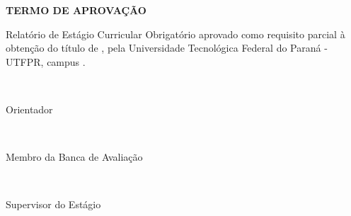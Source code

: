 \makeatletter

\begin{center}
	\Large\textbf{\MakeUppercase{Termo de Aprovação}}
\end{center}

\begin{center}
	\large{\MakeUppercase{\@author}}
\end{center}

\vspace{2\baselineskip plus 1.5\baselineskip minus 0.5\baselineskip}

\begin{center}
	Relatório de Estágio Curricular Obrigatório aprovado como requisito parcial à obtenção do título de \MakeUppercase{\@titulo}, pela Universidade Tecnológica Federal do Paraná - UTFPR, campus \@cidade.
\end{center}

\vspace{2\baselineskip plus 1.5\baselineskip minus 0.5\baselineskip}

\begin{flushright}%
	\begin{minipage}{0.5\textwidth}%
		\@orientador\\\vspace{-0.5cm}
		\begin{flushright}
			Orientador
		\end{flushright}		
	\end{minipage}
\end{flushright}

\vspace{2\baselineskip plus 1.5\baselineskip minus 0.5\baselineskip}

\begin{flushright}%
	\begin{minipage}{0.5\textwidth}%
		\@avaliador\\\vspace{-0.5cm}
		\begin{flushright}
			Membro da Banca de Avaliação
		\end{flushright}		
	\end{minipage}
\end{flushright}

\vspace{2\baselineskip plus 1.5\baselineskip minus 0.5\baselineskip}

\begin{flushright}%
	\begin{minipage}{0.5\textwidth}%
		\@supervisor\\\vspace{-0.5cm}
		\begin{flushright}
			Supervisor do Estágio
		\end{flushright}		
	\end{minipage}
\end{flushright}


